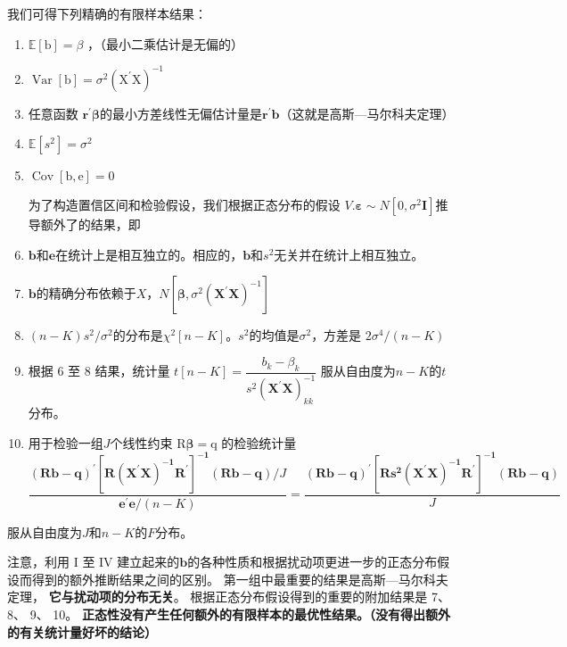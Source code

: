 我们可得下列精确的有限样本结果：
\begin{enumerate}
    \item $ \mathbb{E}[\mathrm{b}]=\beta $ ，（最小二乘估计是无偏的） 
    \item $ \operatorname{Var}[\mathrm{b}]=\sigma^{2}\left(  \boldsymbol{\mathrm{X}^{\prime} \mathrm{X}}\right)^{-1} $
    \item 任意函数 $  \boldsymbol{r^{\prime} \beta} $的最小方差线性无偏估计量是$  \boldsymbol{r^{\prime}b} $（这就是高斯—马尔科夫定理）
    \item $ \mathbb{E}\left[s^{2}\right]=\sigma^{2} $
    \item $ \operatorname{Cov}[ \boldsymbol{\mathrm{b}, \mathrm{e}}]=0 $
    
    为了构造置信区间和检验假设，我们根据正态分布的假设 $ V .  \boldsymbol{\varepsilon} \sim N\left[0, \sigma^{2}  \boldsymbol{I} \right] $推导额外了的结果，即
    \item $  \boldsymbol{b} $和$  \boldsymbol{e} $在统计上是相互独立的。相应的，$  \boldsymbol{b} $和$ s^{2} $无关并在统计上相互独立。
    \item $  \boldsymbol{b} $的精确分布依赖于$ X $，$ N\left[ \boldsymbol{\beta}, \sigma^{2}\left( \boldsymbol{X^{\prime} X}\right)^{-1}\right] $
    \item $ (n-K) s^{2} / \sigma^{2} $的分布是$ \chi^{2}[n-K] $。$ s^{2} $的均值是$ \sigma^{2} $，方差是 $ 2 \sigma^{4} /(n-K) $
    \item 根据 6 至 8 结果，统计量 $ t[n-K]=\dfrac{b_{k}-\beta_{k}}{\left.s^{2}\left( \boldsymbol{X^{\prime} X} \right)_{k k}^{-1}\right.} $ 服从自由度为$ n-K $的$ t $分布。
    \item 用于检验一组$ J $个线性约束 $  \boldsymbol{\mathrm{R} \beta=\mathrm{q}} $ 的检验统计量
    $$ \frac{ \boldsymbol{(R b-q)^{\prime}\left[R\left(X^{\prime} X\right)^{-1} R^{\prime}\right]^{-1}(R b-q)} / J}{ \boldsymbol{e^{\prime} e} /(n-K)}
        =\frac{ \boldsymbol{(R b-q)^{\prime}\left[R s^{2}\left(X^{\prime} X\right)^{-1} R^{\prime}\right]^{-1}(R b-q)}}{J} $$
\end{enumerate}

    服从自由度为$ J $和$ n-K $的$ F $分布。

    注意，利用 I 至 IV 建立起来的$  \boldsymbol{b} $的各种性质和根据扰动项更进一步的正态分布假设而得到的额外推断结果之间的区别。
    第一组中最重要的结果是高斯—马尔科夫定理，{ \bf 它与扰动项的分布无关}。 根据正态分布假设得到的重要的附加结果是 7、 8、 9、 10。 
    {\bf 正态性没有产生任何额外的有限样本的最优性结果。（没有得出额外的有关统计量好坏的结论）}

